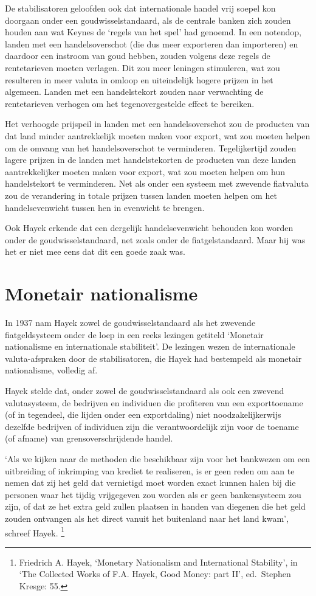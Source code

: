 \documentclass[
  a5paper,
  smalldemyvopaper,11pt,twoside,onecolumn,openright,extrafontsizes]{memoir}
\begin{document}
De stabilisatoren geloofden ook dat internationale handel vrij soepel
kon doorgaan onder een goudwisselstandaard, als de centrale banken zich
zouden houden aan wat Keynes de `regels van het spel' had genoemd. In
een notendop, landen met een handelsoverschot (die dus meer exporteren
dan importeren) en daardoor een instroom van goud hebben, zouden volgens
deze regels de rentetarieven moeten verlagen. Dit zou meer leningen
stimuleren, wat zou resulteren in meer valuta in omloop en uiteindelijk
hogere prijzen in het algemeen. Landen met een handelstekort zouden naar
verwachting de rentetarieven verhogen om het tegenovergestelde effect te
bereiken.

Het verhoogde prijspeil in landen met een handelsoverschot zou de
producten van dat land minder aantrekkelijk moeten maken voor export,
wat zou moeten helpen om de omvang van het handelsoverschot te
verminderen. Tegelijkertijd zouden lagere prijzen in de landen met
handelstekorten de producten van deze landen aantrekkelijker moeten
maken voor export, wat zou moeten helpen om hun handelstekort te
verminderen. Net als onder een systeem met zwevende fiatvaluta zou de
verandering in totale prijzen tussen landen moeten helpen om het
handelsevenwicht tussen hen in evenwicht te brengen.

Ook Hayek erkende dat een dergelijk handelsevenwicht behouden kon worden
onder de goudwisselstandaard, net zoals onder de fiatgelstandaard. Maar
hij was het er niet mee eens dat dit een goede zaak was.

\section{Monetair nationalisme}\label{monetair-nationalisme}

In 1937 nam Hayek zowel de goudwisselstandaard als het zwevende
fiatgeldsysteem onder de loep in een reeks lezingen getiteld `Monetair
nationalisme en internationale stabiliteit'. De lezingen wezen de
internationale valuta-afspraken door de stabilisatoren, die Hayek had
bestempeld als monetair nationalisme, volledig af.

Hayek stelde dat, onder zowel de goudwisselstandaard als ook een zwevend
valutasysteem, de bedrijven en individuen die profiteren van een
exporttoename (of in tegendeel, die lijden onder een exportdaling) niet
noodzakelijkerwijs dezelfde bedrijven of individuen zijn die
verantwoordelijk zijn voor de toename (of afname) van
grensoverschrijdende handel.

`Als we kijken naar de methoden die beschikbaar zijn voor het bankwezen
om een uitbreiding of inkrimping van krediet te realiseren, is er geen
reden om aan te nemen dat zij het geld dat vernietigd moet worden exact
kunnen halen bij die personen waar het tijdig vrijgegeven zou worden als
er geen bankensysteem zou zijn, of dat ze het extra geld zullen plaatsen
in handen van diegenen die het geld zouden ontvangen als het direct
vanuit het buitenland naar het land kwam', schreef Hayek. \footnote{\hspace{0pt}Friedrich
  A. Hayek, `Monetary Nationalism and International Stability', in `The
  Collected Works of F.A. Hayek, Good Money: part II', ed.~Stephen
  Kresge: 55.}
\end{document}
